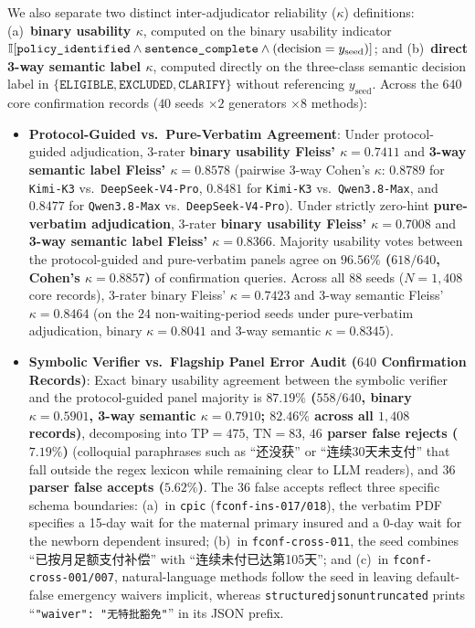 \documentclass[10pt,twocolumn]{article}
\renewcommand{\_}{\textunderscore\allowbreak}
\begin{document}
We also separate two distinct inter-adjudicator reliability ($\kappa$) definitions: (a)~\textbf{binary usability $\kappa$}, computed on the binary usability indicator $\mathbb{I}[\texttt{policy\_identified} \wedge \texttt{sentence\_complete} \wedge (\text{decision} = y_{\text{seed}})]$; and (b)~\textbf{direct 3-way semantic label $\kappa$}, computed directly on the three-class semantic decision label in $\{\texttt{ELIGIBLE}, \texttt{EXCLUDED}, \texttt{CLARIFY}\}$ without referencing $y_{\text{seed}}$. Across the $640$ core confirmation records ($40$ seeds $\times 2$ generators $\times 8$ methods):
\begin{itemize}[leftmargin=*,nosep]
  \item \textbf{Protocol-Guided vs.\ Pure-Verbatim Agreement}: Under protocol-guided adjudication, 3-rater \textbf{binary usability Fleiss' $\kappa = 0.7411$} and \textbf{3-way semantic label Fleiss' $\kappa = 0.8578$} (pairwise 3-way Cohen's $\kappa$: $0.8789$ for \texttt{Kimi-K3} vs.\ \texttt{DeepSeek-V4-Pro}, $0.8481$ for \texttt{Kimi-K3} vs.\ \texttt{Qwen3.8-Max}, and $0.8477$ for \texttt{Qwen3.8-Max} vs.\ \texttt{DeepSeek-V4-Pro}). Under strictly zero-hint \textbf{pure-verbatim adjudication}, 3-rater \textbf{binary usability Fleiss' $\kappa = 0.7008$} and \textbf{3-way semantic label Fleiss' $\kappa = 0.8366$}. Majority usability votes between the protocol-guided and pure-verbatim panels agree on \textbf{$96.56\%$ ($618/640$, Cohen's $\kappa = 0.8857$)} of confirmation queries. Across all $88$ seeds ($N=1{,}408$ core records), 3-rater binary Fleiss' $\kappa = 0.7423$ and 3-way semantic Fleiss' $\kappa = 0.8464$ (on the $24$ non-waiting-period seeds under pure-verbatim adjudication, binary $\kappa = 0.8041$ and 3-way semantic $\kappa = 0.8345$).
  \item \textbf{Symbolic Verifier vs.\ Flagship Panel Error Audit ($640$ Confirmation Records)}: Exact binary usability agreement between the symbolic verifier and the protocol-guided panel majority is \textbf{$87.19\%$ ($558/640$, binary $\kappa = 0.5901$, 3-way semantic $\kappa = 0.7910$; $82.46\%$ across all $1{,}408$ records)}, decomposing into $\text{TP}=475$, $\text{TN}=83$, \textbf{$46$ parser false rejects ($7.19\%$)} (colloquial paraphrases such as ``还没获'' or ``连续30天未支付'' that fall outside the regex lexicon while remaining clear to LLM readers), and \textbf{$36$ parser false accepts ($5.62\%$)}. The $36$ false accepts reflect three specific schema boundaries: (a)~in \texttt{cpic\_106702} (\texttt{fconf-ins-017/018}), the verbatim PDF specifies a 15-day wait for the maternal primary insured and a 0-day wait for the newborn dependent insured; (b)~in \texttt{fconf-cross-011}, the seed combines ``已按月足额支付补偿'' with ``连续未付已达第105天''; and (c)~in \texttt{fconf-cross-001/007}, natural-language methods follow the seed in leaving default-false emergency waivers implicit, whereas \texttt{structured\_json\_untruncated\_320} prints ``\texttt{"waiver": "无特批豁免"}'' in its JSON prefix.
\end{itemize}
\end{document}
